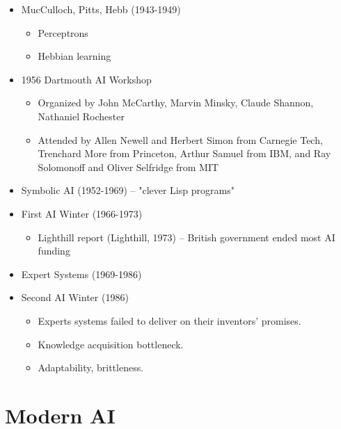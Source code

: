\documentclass[11pt]{article}
\begin{document}
\begin{itemize}
\item MucCulloch, Pitts, Hebb (1943-1949)

\begin{itemize}
\item Perceptrons
\item Hebbian learning
\end{itemize}

\item 1956 Dartmouth AI Workshop

\begin{itemize}
\item Organized by John McCarthy, Marvin Minsky, Claude Shannon, Nathaniel Rochester
\item Attended by Allen Newell and Herbert Simon from Carnegie Tech, Trenchard More from Princeton, Arthur Samuel from IBM, and Ray Solomonoff and Oliver Selfridge from MIT
\end{itemize}

\item Symbolic AI (1952-1969) -- "clever Lisp programs"

\item First AI Winter (1966-1973)

\begin{itemize}
\item Lighthill report (Lighthill, 1973) -- British government ended most AI funding
\end{itemize}

\item Expert Systems (1969-1986)

\item Second AI Winter (1986)

\begin{itemize}
\item Experts systems failed to deliver on their inventors' promises.
\item Knowledge acquisition bottleneck.
\item Adaptability, brittleness.
\end{itemize}
\end{itemize}
\section{Modern AI}
\label{sec:org59c7d4d}
\end{document}
